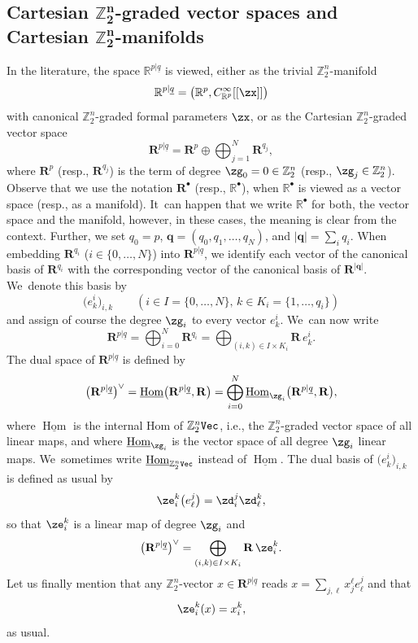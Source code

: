 \documentclass[pdftex]{sigma}%
\newcommand{\op}[1]{\operatorname{#1}}
\newcommand{\R}{{\mathbb R}}
\newcommand{\Z}{{\mathbb Z}}
\def\ul{\underline}
\def\ul{\underline}
\newcommand{\0}{\otimes}
\newcommand{\z}{\Z_2^n}
\numberwithin{equation}{section}
\begin{document}
\subsection[Cartesian Z2n-graded vector spaces and Cartesian Z2n-manifolds]
{Cartesian $\boldsymbol{\Z_2^n}$-graded vector spaces and Cartesian $\boldsymbol{\Z_2^n}$-manifolds}
\newcommand{\mbf}{\mathbf}
\newcommand{\Ci}{C^\infty}
\newcommand{\iho}{\ul{\op{Hom}}}
In the literature, the space $\R^{p|\ul{q}}$ is viewed, either as the trivial $\Z_2^n$-manifold
\[
\R^{p|\ul{q}}=\big(\R^p,\Ci_{\R^p}[[\zx]]\big)
\]
with canonical $\z$-graded formal parameters $\zx$, or as the Cartesian $\Z_2^n$-graded vector space
\[
\mbf{R}^{p|\ul{q}}=\mbf{R}^p\oplus\bigoplus_{j=1}^N\mbf{R}^{q_j},
\]
where $\mbf{R}^p$ (resp., $\mbf{R}^{q_j}$) is the term of degree $\zg_0=0\in\Z_2^n$ (resp., $\zg_j\in\Z_2^n$). Observe that we use the notation $\mbf{R}^\bullet$ (resp., $\R^\bullet$), when $\R^\bullet$ is viewed as a vector space (resp., as a manifold). It~can happen that we write $\R^\bullet$ for both, the vector space and the manifold, however, in these cases, the meaning is clear from the context. Further, we set $q_0=p$, $\mathbf{q}=(q_0,q_1,\dots,q_N)$, and $|\mathbf{q}|=\sum_iq_i$. When embedding $\mbf{R}^{q_i}$ ($i\in\{0,\dots,N\}$) into $\mbf{R}^{p|\ul{q}}$, we identify each vector of the canonical basis of $\mbf{R}^{q_i}$ with the corresponding vector of the canonical basis of $\mbf{R}^{|\mathbf{q}|}$. We~denote this basis by
\[
\big(e^i_k\big)_{i,k}\qquad (i\in I=\{0,\dots,N\},\, k\in K_i=\{1,\dots,q_i\})
\]
and assign of course the degree $\zg_i$ to every vector $e^i_k$. We~can now write
\[
\mbf{R}^{p|\ul q}=\bigoplus_{i=0}^N\mbf{R}^{q_i}=\bigoplus_{(i,k)\in I\times K_i}\mbf{R}\, e^i_k.
\]
The dual space of $\mbf{R}^{p|\ul q}$ is defined by
\[
\big(\mbf{R}^{p|\ul q}\big)^\vee = \ul{\op{Hom}}\big(\mbf{R}^{p|\ul q},\mbf{R}\big)=\bigoplus_{i=0}^N\iho_{\zg_i}\big(\mbf{R}^{p|\ul q},\mbf{R}\big),
\]
where $\iho$ is the internal Hom of $\Z_2^n\tt Vec$, i.e., the $\Z_2^n$-graded vector space of all linear maps, and where $\iho_{\zg_i}$ is the vector space of all degree $\zg_i$ linear maps. We~sometimes write $\iho_{\Z_2^n\tt Vec}$ instead of $\iho$. The dual basis of $\big(e^i_k\big)_{i,k}$ is defined as usual by
\[
\ze^k_i\big(e^j_\ell\big)=\zd^j_i\zd^k_\ell,
\]
so that $\ze^k_i$ is a linear map of degree $\zg_i$ and
\[
\big(\mbf{R}^{p|\ul q}\big)^\vee=\bigoplus_{(i,k)\in I\times K_i}\mbf{R}\,\ze^k_i.
\]
Let us finally mention that any $\Z_2^n$-vector $x\in\mbf{R}^{p|\ul q}$ reads $x=\sum_{j,\ell}x^\ell_j e^j_\ell$ and that
\begin{gather}\label{Ass1}
\ze^k_i(x)=x^k_i,
\end{gather}
as usual.
\end{document}
